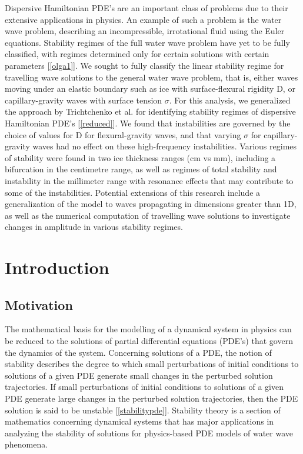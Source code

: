 \documentclass{article}
\begin{document}
Dispersive Hamiltonian PDE's are an important class of problems due to their extensive applications in physics. An example of such a problem is the water wave problem, describing an incompressible, irrotational fluid using the Euler equations. Stability regimes of the full water wave problem have yet to be fully classified, with regimes determined only for certain solutions with certain parameters [\ref{olga1}]. We sought to fully classify the linear stability regime for travelling wave solutions to the general water wave problem, that is, either waves moving under an elastic boundary such as ice with surface-flexural rigidity D, or capillary-gravity waves with surface tension \(\sigma\). For this analysis, we generalized the approach by Trichtchenko et al. for identifying stability regimes of dispersive Hamiltonian PDE’s [\ref{reduced}]. We found that instabilities are governed by the choice of values for D for flexural-gravity waves, and that varying \(\sigma\) for capillary-gravity waves had no effect on these high-frequency instabilities. Various regimes of stability were found in two ice thickness ranges (cm vs mm), including a bifurcation in the centimetre range, as well as regimes of total stability and instability in the millimeter range with resonance effects that may contribute to some of the instabilities. Potential extensions of this research include a generalization of the model to waves propagating in dimensions greater than 1D, as well as the numerical computation of travelling wave solutions to investigate changes in amplitude in various stability regimes. 


\clearpage 


\section{Introduction}



\subsection{Motivation}

The mathematical basis for the modelling of a dynamical system in physics can be reduced to the solutions of partial differential equations (PDE’s) that govern the dynamics of the system. Concerning solutions of a PDE, the notion of stability describes the degree to which small perturbations of initial conditions to solutions of a given PDE generate small changes in the perturbed solution trajectories. If small perturbations of initial conditions to solutions of a given PDE generate large changes in the perturbed solution trajectories, then the PDE solution is said to be unstable [\ref{stabilitypde}]. Stability theory is a section of mathematics concerning dynamical systems that has major applications in analyzing the stability of solutions for physics-based PDE models of water wave phenomena. \\
\end{document}
